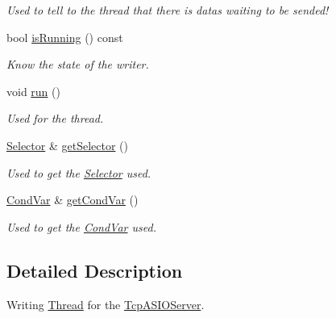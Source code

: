 \begin{DoxyCompactItemize}
\begin{DoxyCompactList}\small\item\em Used to tell to the thread that there is datas waiting to be sended! \end{DoxyCompactList}\item 
bool \hyperlink{classmognetwork_1_1_tcp_a_s_i_o_writer_a0117301d2bb36f3d2b44039e16dd286d}{is\-Running} () const 
\begin{DoxyCompactList}\small\item\em Know the state of the writer. \end{DoxyCompactList}\item 
\hypertarget{classmognetwork_1_1_tcp_a_s_i_o_writer_ab3d1361bd19d8d09b278f9a361b058ea}{void \hyperlink{classmognetwork_1_1_tcp_a_s_i_o_writer_ab3d1361bd19d8d09b278f9a361b058ea}{run} ()}\label{classmognetwork_1_1_tcp_a_s_i_o_writer_ab3d1361bd19d8d09b278f9a361b058ea}

\begin{DoxyCompactList}\small\item\em Used for the thread. \end{DoxyCompactList}\item 
\hyperlink{classmognetwork_1_1_selector}{Selector} \& \hyperlink{classmognetwork_1_1_tcp_a_s_i_o_writer_ab7f6474ccd1082d2fc9f8acd2be87d3c}{get\-Selector} ()
\begin{DoxyCompactList}\small\item\em Used to get the \hyperlink{classmognetwork_1_1_selector}{Selector} used. \end{DoxyCompactList}\item 
\hyperlink{classmognetwork_1_1_cond_var}{Cond\-Var} \& \hyperlink{classmognetwork_1_1_tcp_a_s_i_o_writer_ad312e3f3f5bd50ca728fec3e1c4476e6}{get\-Cond\-Var} ()
\begin{DoxyCompactList}\small\item\em Used to get the \hyperlink{classmognetwork_1_1_cond_var}{Cond\-Var} used. \end{DoxyCompactList}\end{DoxyCompactItemize}


\subsection{Detailed Description}
Writing \hyperlink{classmognetwork_1_1_thread}{Thread} for the \hyperlink{classmognetwork_1_1_tcp_a_s_i_o_server}{Tcp\-A\-S\-I\-O\-Server}. 

